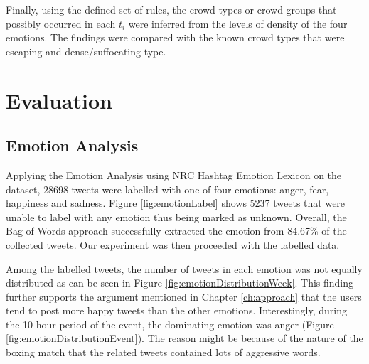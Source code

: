 Finally, using the defined set of rules, the crowd types or crowd groups that possibly occurred in each \(t_i\) were inferred from the levels of density of the four emotions. The findings were compared with the known crowd types that were escaping and dense/suffocating type.

\section{Evaluation}
\subsection{Emotion Analysis}

Applying the Emotion Analysis using NRC Hashtag Emotion Lexicon \citep{mohammad2014using} on the dataset, 28698 tweets were labelled with one of four emotions: anger, fear, happiness and sadness. Figure \ref{fig:emotionLabel} shows 5237 tweets that were unable to label with any emotion thus being marked as unknown. Overall, the Bag-of-Words approach successfully extracted the emotion from 84.67\% of the collected tweets. Our experiment was then proceeded with the labelled data.

Among the labelled tweets, the number of tweets in each emotion was not equally distributed as can be seen in Figure \ref{fig:emotionDistributionWeek}. This finding further supports the argument mentioned in Chapter \ref{ch:approach} that the users tend to post more happy tweets than the other emotions. Interestingly, during the 10 hour period of the event, the dominating emotion was anger (Figure \ref{fig:emotionDistributionEvent}). The reason might be because of the nature of the boxing match that the related tweets contained lots of aggressive words.

